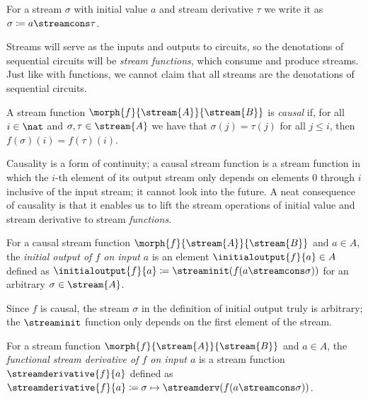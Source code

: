 \begin{notation}
    For a stream \(\sigma\) with initial value \(a\) and stream derivative
    \(\tau\) we write it as \(\sigma \coloneqq a \streamcons \tau\).
\end{notation}

Streams will serve as the inputs and outputs to circuits, so the denotations of
sequential circuits will be \emph{stream functions}, which consume and produce
streams.
Just like with functions, we cannot claim that all streams are the
denotations of sequential circuits.

\begin{definition}
    A stream function \(\morph{f}{\stream{A}}{\stream{B}}\) is \emph{causal} if,
    for all \(i \in \nat\) and \(\sigma,\tau \in \stream{A}\) we have that
    \(\sigma(j) = \tau(j)\) for all \(j \leq i\), then
    \(f(\sigma)(i) = f(\tau)(i)\).
\end{definition}

Causality is a form of continuity; a causal stream function is a stream function
in which the \(i\)-th element of its output stream only depends on elements
\(0\) through \(i\) inclusive of the input stream; it cannot look into the
future.
A neat consequence of causality is that it enables us to lift the stream
operations of initial value and stream derivative to stream \emph{functions}.

\begin{definition}
    For a causal stream function \(\morph{f}{\stream{A}}{\stream{B}}\) and
    \(a \in A\), the \emph{initial output of \(f\) on input \(a\)} is an element
    \(\initialoutput{f}{a} \in A\) defined as
    \(\initialoutput{f}{a} \coloneqq \streaminit(f(a \streamcons \sigma))\) for
    an arbitrary \(\sigma \in \stream{A}\).
\end{definition}

Since \(f\) is causal, the stream \(\sigma\) in the definition of initial
output truly is arbitrary; the \(\streaminit\) function only depends on the
first element of the stream.

\begin{definition}
    For a stream function \(\morph{f}{\stream{A}}{\stream{B}}\) and
    \(a \in A\), the
    \emph{functional stream derivative of \(f\) on input \(a\)} is a stream
    function \(\streamderivative{f}{a}\) defined as \(
    \streamderivative{f}{a}
    \coloneqq
    \sigma \mapsto \streamderv(f(a \streamcons \sigma))
    \).
\end{definition}

